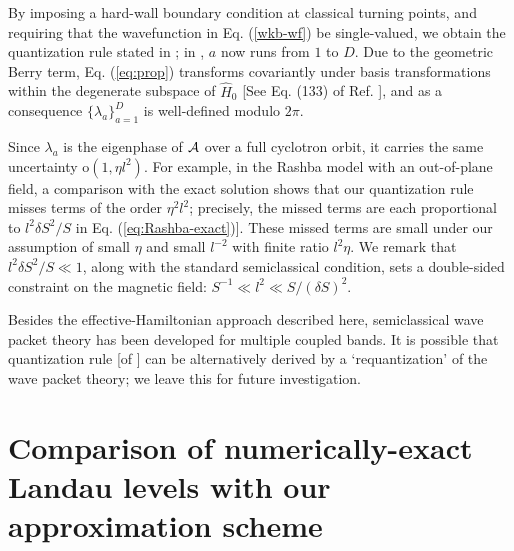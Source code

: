 \documentclass[aps, showpacs, twocolumn, notitlepage, superscriptaddress]{revtex4-1}
\begin{document}


By imposing a hard-wall boundary condition at classical turning points, and requiring that the wavefunction in Eq. (\ref{wkb-wf}) be single-valued,\cite{100p} we obtain the quantization rule  stated in ; in , $a$ now runs from $1$ to $D$. Due to the geometric Berry term, Eq. ({\ref{eq:prop}}) transforms covariantly under basis transformations within the degenerate subspace of $\hat{H}_0$ [See Eq. (133) of Ref. ], and as a consequence $\{\lambda_a\}_{a=1}^D$ is well-defined modulo $2\pi$.

Since $\lambda_a$ is the eigenphase of ${\cal A}$ over a full cyclotron orbit, it carries the same uncertainty $\text{o}(1, \eta l^2)$. For example, in the Rashba model with an out-of-plane field, a comparison with the exact solution shows that our quantization rule misses terms of the order $\eta^2 l^2$; precisely, the missed terms are each proportional to  $l^2\delta S^2/S$ in Eq. (\ref{eq:Rashba-exact})]. These missed terms are small under our assumption of small $\eta$ and small $l^{-2}$ with finite ratio $l^2\eta$. We remark that $l^2\delta S^2/S\ll 1$, along with the standard semiclassical condition, sets a double-sided constraint on the magnetic field: $S^{-1} \ll l^2 \ll S/(\delta S)^2$. 


Besides the effective-Hamiltonian approach described here, semiclassical wave packet theory has been developed for multiple coupled bands\cite{culcer_coherent_2005}. It is possible that quantization rule [of ] can be alternatively derived by a `requantization' of the wave packet theory\cite{xiao_berry_2010}; we leave this for future investigation.  

\section{Comparison of numerically-exact Landau levels with our approximation scheme}\label{app:approximatevsexact}
\end{document}
